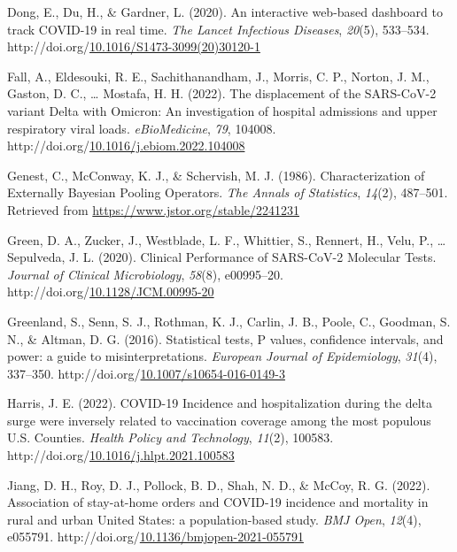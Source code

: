 \documentclass[12pt,twoside]{smiththesis}
\newlength{\cslhangindent}
\newenvironment{CSLReferences}[2] %
 {%
\setlength{\parindent}{0pt}
\ifodd #1 \everypar{\setlength{\hangindent}{\cslhangindent}}\ignorespaces\fi
\ifnum #2 > 0
\setlength{\parskip}{#2\baselineskip}
  \fi
}%
{}
\begin{document}
\begin{CSLReferences}{1}{0}
\leavevmode{}%
Dong, E., Du, H., \& Gardner, L. (2020). An interactive web-based dashboard to track COVID-19 in real time. \emph{The Lancet Infectious Diseases}, \emph{20}(5), 533--534. http://doi.org/\href{https://doi.org/10.1016/S1473-3099(20)30120-1}{10.1016/S1473-3099(20)30120-1}

\leavevmode{}%
Fall, A., Eldesouki, R. E., Sachithanandham, J., Morris, C. P., Norton, J. M., Gaston, D. C., \ldots{} Mostafa, H. H. (2022). The displacement of the SARS-CoV-2 variant Delta with Omicron: An investigation of hospital admissions and upper respiratory viral loads. \emph{eBioMedicine}, \emph{79}, 104008. http://doi.org/\href{https://doi.org/10.1016/j.ebiom.2022.104008}{10.1016/j.ebiom.2022.104008}

\leavevmode{}%
Genest, C., McConway, K. J., \& Schervish, M. J. (1986). Characterization of Externally Bayesian Pooling Operators. \emph{The Annals of Statistics}, \emph{14}(2), 487--501. Retrieved from \url{https://www.jstor.org/stable/2241231}

\leavevmode{}%
Green, D. A., Zucker, J., Westblade, L. F., Whittier, S., Rennert, H., Velu, P., \ldots{} Sepulveda, J. L. (2020). Clinical Performance of SARS-CoV-2 Molecular Tests. \emph{Journal of Clinical Microbiology}, \emph{58}(8), e00995--20. http://doi.org/\href{https://doi.org/10.1128/JCM.00995-20}{10.1128/JCM.00995-20}

\leavevmode{}%
Greenland, S., Senn, S. J., Rothman, K. J., Carlin, J. B., Poole, C., Goodman, S. N., \& Altman, D. G. (2016). Statistical tests, P values, confidence intervals, and power: a guide to misinterpretations. \emph{European Journal of Epidemiology}, \emph{31}(4), 337--350. http://doi.org/\href{https://doi.org/10.1007/s10654-016-0149-3}{10.1007/s10654-016-0149-3}

\leavevmode{}%
Harris, J. E. (2022). COVID-19 Incidence and hospitalization during the delta surge were inversely related to vaccination coverage among the most populous U.S. Counties. \emph{Health Policy and Technology}, \emph{11}(2), 100583. http://doi.org/\href{https://doi.org/10.1016/j.hlpt.2021.100583}{10.1016/j.hlpt.2021.100583}

\leavevmode{}%
Jiang, D. H., Roy, D. J., Pollock, B. D., Shah, N. D., \& McCoy, R. G. (2022). Association of stay-at-home orders and COVID-19 incidence and mortality in rural and urban United States: a population-based study. \emph{BMJ Open}, \emph{12}(4), e055791. http://doi.org/\href{https://doi.org/10.1136/bmjopen-2021-055791}{10.1136/bmjopen-2021-055791}


\end{CSLReferences}
\end{document}
